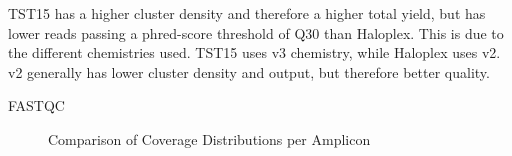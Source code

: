 TST15 has a higher cluster density and therefore a higher total yield, but has
lower reads passing a phred-score threshold of Q30 than Haloplex. This is due to
the different chemistries used. TST15 uses v3 chemistry, while Haloplex uses v2.
v2 generally has lower cluster density and output, but therefore better quality.

FASTQC
\begin{figure}[!tbp]
  \centering
  \hfill
  \caption{Comparison of Coverage Distributions per Amplicon}
\end{figure}

